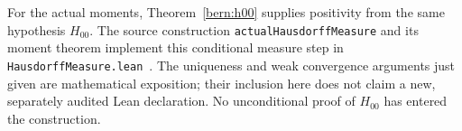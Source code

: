 For the actual moments, Theorem~\ref{bern:h00} supplies positivity
from the same hypothesis $H_{00}$. The source construction
\texttt{actualHausdorffMeasure} and its moment theorem implement this
conditional measure step in \texttt{HausdorffMeasure.lean}~\cite{source}.
The uniqueness and weak convergence arguments just given are
mathematical exposition; their inclusion here does not claim a new,
separately audited Lean declaration. No unconditional proof of
$H_{00}$ has entered the construction.
